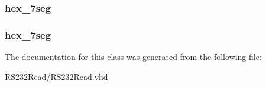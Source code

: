\subsubsection[{u03}]{ {\bfseries \textcolor{vhdlchar}{hex\+\_\+7seg}\textcolor{vhdlchar}{ }} \hspace{0.3cm}{\ttfamily [Instantiation]}}\label{class_r_s232_read_1_1moore_a18f0f105eb40d1848d58145647ae9c20}
\hypertarget{class_r_s232_read_1_1moore_a5280b1059f40a0cadd6bccddcb7705dd}{}
\subsubsection[{u04}]{ {\bfseries \textcolor{vhdlchar}{hex\+\_\+7seg}\textcolor{vhdlchar}{ }} \hspace{0.3cm}{\ttfamily [Instantiation]}}\label{class_r_s232_read_1_1moore_a5280b1059f40a0cadd6bccddcb7705dd}


The documentation for this class was generated from the following file\+:\begin{DoxyCompactItemize}
\item 
R\+S232\+Read/\hyperlink{_r_s232_read_8vhd}{R\+S232\+Read.\+vhd}\end{DoxyCompactItemize}
